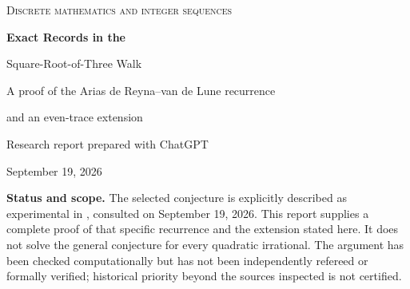 \documentclass[11pt]{article}
\theoremstyle{definition}
\numberwithin{equation}{section}
\begin{document}
\hypersetup{pageanchor=false}
\begin{titlepage}
\vspace*{0.45in}
{\color{ink}\Large\scshape Discrete mathematics and integer sequences\par}
\vspace{0.4in}
{\color{ink}\huge\bfseries Exact Records in the\par Square-Root-of-Three Walk\par}
\vspace{0.25in}
{\Large A proof of the Arias de Reyna--van de Lune recurrence\par and an even-trace extension\par}
\vspace{0.35in}
{\large Research report prepared with ChatGPT\par}
{\large September 19, 2026\par}
\vspace{0.4in}
\begin{abstract}
Consider the integer-valued walk
\[
 S(N)=\sum_{n=1}^{N}(-1)^{\lfloor n\sqrt3\rfloor},\qquad S(0)=0.
\]
A conjecture, reproduced in the recent work of Bruin and Fokkink, gives a four-phase linear recurrence for the first occurrences of new values of this walk. We prove that recurrence by identifying an exact first-passage lift
\[
 F(m)=4\lfloor(2+\sqrt3)m\rfloor-m+7.
\]
The successive record positions are exactly $R_{4q+j}=F^q(j)$ for $0\le j\le3$. The proof establishes minimality of every first passage, not merely the value at a proposed record. We obtain the rational generating function of the full record sequence, explicit closed forms, and the sharp asymmetry
\[
 \limsup_{N\to\infty}\frac{S(N)}{\log N}
 =\frac1{2\log(2+\sqrt3)},\qquad
 \liminf_{N\to\infty}\frac{S(N)}{\log N}
 =-\frac3{2\log(2+\sqrt3)}.
\]
An extension treats every even integer $D\ge4$ and the quadratic slope $(D+\sqrt{D^2-4})/2$. All proofs are elementary and independent of the supplied exact-integer computations.
\end{abstract}
\vfill
\begin{tcolorbox}[colback=lightink,colframe=ink,boxrule=0.5pt]
\small\textbf{Status and scope.} The selected conjecture is explicitly described as experimental in \cite[Section~2, p.~7]{BF}, consulted on September 19, 2026. This report supplies a complete proof of that specific recurrence and the extension stated here. It does not solve the general conjecture for every quadratic irrational. The argument has been checked computationally but has not been independently refereed or formally verified; historical priority beyond the sources inspected is not certified.
\end{tcolorbox}
\end{titlepage}
\hypersetup{pageanchor=true}
\tableofcontents
\newpage
\end{document}
